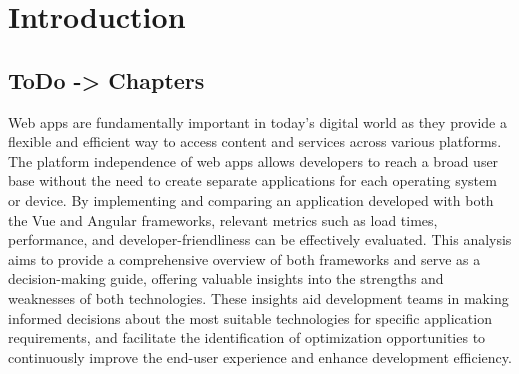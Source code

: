 \chapter{Introduction}
\label{cha:Introduction}


\section{ToDo -> Chapters}

Web apps are fundamentally important in today's digital world as they provide a flexible and efficient way to access content and services across various platforms. The platform independence of web apps allows developers to reach a broad user base without the need to create separate applications for each operating system or device. By implementing and comparing an application developed with both the Vue and Angular frameworks, relevant metrics such as load times, performance, and developer-friendliness can be effectively evaluated. This analysis aims to provide a comprehensive overview of both frameworks and serve as a decision-making guide, offering valuable insights into the strengths and weaknesses of both technologies. These insights aid development teams in making informed decisions about the most suitable technologies for specific application requirements, and facilitate the identification of optimization opportunities to continuously improve the end-user experience and enhance development efficiency.



